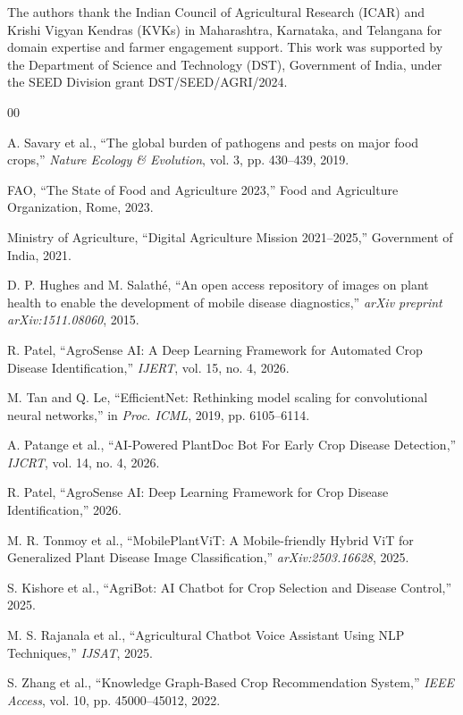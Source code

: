 \documentclass[conference]{IEEEtran}
\begin{document}
The authors thank the Indian Council of Agricultural Research (ICAR) and Krishi Vigyan Kendras (KVKs) in Maharashtra, Karnataka, and Telangana for domain expertise and farmer engagement support. This work was supported by the Department of Science and Technology (DST), Government of India, under the SEED Division grant DST/SEED/AGRI/2024.

\begin{thebibliography}{00}

 A. Savary et al., ``The global burden of pathogens and pests on major food crops,'' \textit{Nature Ecology \& Evolution}, vol. 3, pp. 430--439, 2019.

 FAO, ``The State of Food and Agriculture 2023,'' Food and Agriculture Organization, Rome, 2023.

 Ministry of Agriculture, ``Digital Agriculture Mission 2021--2025,'' Government of India, 2021.

 D. P. Hughes and M. Salathé, ``An open access repository of images on plant health to enable the development of mobile disease diagnostics,'' \textit{arXiv preprint arXiv:1511.08060}, 2015.

 R. Patel, ``AgroSense AI: A Deep Learning Framework for Automated Crop Disease Identification,'' \textit{IJERT}, vol. 15, no. 4, 2026.

 M. Tan and Q. Le, ``EfficientNet: Rethinking model scaling for convolutional neural networks,'' in \textit{Proc. ICML}, 2019, pp. 6105--6114.

 A. Patange et al., ``AI-Powered PlantDoc Bot For Early Crop Disease Detection,'' \textit{IJCRT}, vol. 14, no. 4, 2026.

 R. Patel, ``AgroSense AI: Deep Learning Framework for Crop Disease Identification,'' 2026.

 M. R. Tonmoy et al., ``MobilePlantViT: A Mobile-friendly Hybrid ViT for Generalized Plant Disease Image Classification,'' \textit{arXiv:2503.16628}, 2025.

 S. Kishore et al., ``AgriBot: AI Chatbot for Crop Selection and Disease Control,'' 2025.

 M. S. Rajanala et al., ``Agricultural Chatbot Voice Assistant Using NLP Techniques,'' \textit{IJSAT}, 2025.

 S. Zhang et al., ``Knowledge Graph-Based Crop Recommendation System,'' \textit{IEEE Access}, vol. 10, pp. 45000--45012, 2022.


\end{thebibliography}
\end{document}
